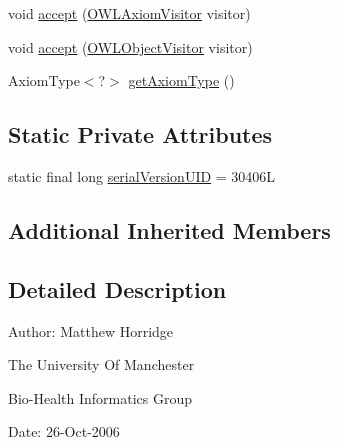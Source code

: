 \begin{DoxyCompactItemize}
\item 
void \hyperlink{classuk_1_1ac_1_1manchester_1_1cs_1_1owl_1_1owlapi_1_1_o_w_l_symmetric_object_property_axiom_impl_a466ae0f7065ea00e59bcae9afd30c55d}{accept} (\hyperlink{interfaceorg_1_1semanticweb_1_1owlapi_1_1model_1_1_o_w_l_axiom_visitor}{O\-W\-L\-Axiom\-Visitor} visitor)
\item 
void \hyperlink{classuk_1_1ac_1_1manchester_1_1cs_1_1owl_1_1owlapi_1_1_o_w_l_symmetric_object_property_axiom_impl_a9282993eb96541c89be426cf1b855c05}{accept} (\hyperlink{interfaceorg_1_1semanticweb_1_1owlapi_1_1model_1_1_o_w_l_object_visitor}{O\-W\-L\-Object\-Visitor} visitor)
\item 
Axiom\-Type$<$?$>$ \hyperlink{classuk_1_1ac_1_1manchester_1_1cs_1_1owl_1_1owlapi_1_1_o_w_l_symmetric_object_property_axiom_impl_ac8ff34528d1f5736b0fc457a7e8c471e}{get\-Axiom\-Type} ()
\end{DoxyCompactItemize}
\subsection*{Static Private Attributes}
\begin{DoxyCompactItemize}
\item 
static final long \hyperlink{classuk_1_1ac_1_1manchester_1_1cs_1_1owl_1_1owlapi_1_1_o_w_l_symmetric_object_property_axiom_impl_a0056c4dd75eef21c35bd6f543c5e0b77}{serial\-Version\-U\-I\-D} = 30406\-L
\end{DoxyCompactItemize}
\subsection*{Additional Inherited Members}


\subsection{Detailed Description}
Author\-: Matthew Horridge\par
 The University Of Manchester\par
 Bio-\/\-Health Informatics Group\par
 Date\-: 26-\/\-Oct-\/2006\par
\par
 


